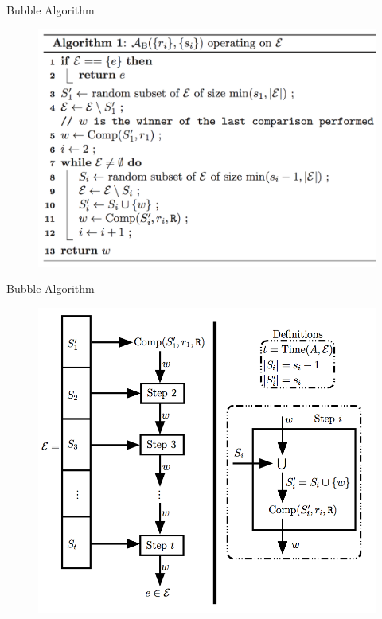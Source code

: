 \documentclass{beamer}
\begin{document}
\begin{frame}{Bubble Algorithm}
			\begin{figure}
				\centering
				\includegraphics[scale=0.4]{images/bubble_a.png}
			\end{figure}
\end{frame}
\begin{frame}{Bubble Algorithm}
			\begin{figure}
				\centering
				\includegraphics[scale=0.4]{images/bubble_g.png}
			\end{figure}
\end{frame}
\end{document}
